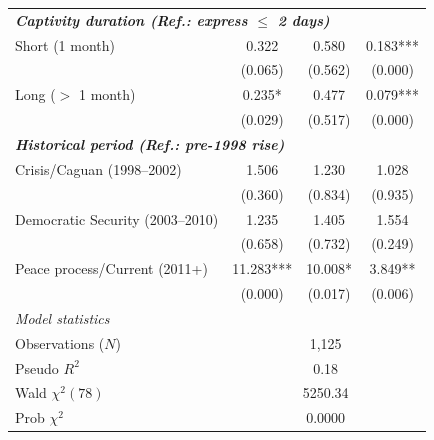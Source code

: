 \documentclass[12pt,a4paper]{article}
\theoremstyle{plain}
\theoremstyle{definition}
\theoremstyle{remark}
\newcommand{\1}{\mathbf{1}}
\begin{document}
{\begin{longtable}{p{}ccc}
    \midrule
    \multicolumn{4}{l}{\textbf{\textit{Captivity duration (Ref.: express $\le$ 2 days)}}} \\
    Short (1 month) & 0.322 & 0.580 & 0.183*** \\
                    & {\scriptsize (0.065)} & {\scriptsize (0.562)} & {\scriptsize (0.000)} \\
    Long ($>$ 1 month) & 0.235* & 0.477 & 0.079*** \\
                       & {\scriptsize (0.029)} & {\scriptsize (0.517)} & {\scriptsize (0.000)} \\
    \midrule
    \multicolumn{4}{l}{\textbf{\textit{Historical period (Ref.: pre-1998 rise)}}} \\
    Crisis/Caguan (1998--2002) & 1.506 & 1.230 & 1.028 \\
                               & {\scriptsize (0.360)} & {\scriptsize (0.834)} & {\scriptsize (0.935)} \\
    Democratic Security (2003--2010) & 1.235 & 1.405 & 1.554 \\
                                    & {\scriptsize (0.658)} & {\scriptsize (0.732)} & {\scriptsize (0.249)} \\
    Peace process/Current (2011+) & 11.283*** & 10.008* & 3.849** \\
                                  & {\scriptsize (0.000)} & {\scriptsize (0.017)} & {\scriptsize (0.006)} \\
    \midrule
    \multicolumn{4}{l}{\textit{Model statistics}} \\
    Observations ($N$) & \multicolumn{3}{c}{1,125} \\
    Pseudo $R^2$ & \multicolumn{3}{c}{0.18} \\
    Wald $\chi^2(78)$ & \multicolumn{3}{c}{5250.34} \\
    Prob $\chi^2$ & \multicolumn{3}{c}{0.0000} \\
\end{longtable}
}
\end{document}
